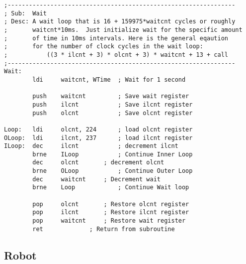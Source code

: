 \documentclass[12pt,letterpaper]{article}
\begin{document}
\begin{verbatim}
;----------------------------------------------------------------
; Sub:  Wait
; Desc: A wait loop that is 16 + 159975*waitcnt cycles or roughly 
;       waitcnt*10ms.  Just initialize wait for the specific amount 
;       of time in 10ms intervals. Here is the general eqaution
;       for the number of clock cycles in the wait loop:
;           ((3 * ilcnt + 3) * olcnt + 3) * waitcnt + 13 + call
;----------------------------------------------------------------
Wait:
        ldi     waitcnt, WTime  ; Wait for 1 second

        push    waitcnt         ; Save wait register
        push    ilcnt           ; Save ilcnt register
        push    olcnt           ; Save olcnt register

Loop:   ldi     olcnt, 224      ; load olcnt register
OLoop:  ldi     ilcnt, 237      ; load ilcnt register
ILoop:  dec     ilcnt           ; decrement ilcnt
        brne    ILoop           ; Continue Inner Loop
        dec     olcnt       ; decrement olcnt
        brne    OLoop           ; Continue Outer Loop
        dec     waitcnt     ; Decrement wait 
        brne    Loop            ; Continue Wait loop    

        pop     olcnt       ; Restore olcnt register
        pop     ilcnt       ; Restore ilcnt register
        pop     waitcnt     ; Restore wait register
        ret             ; Return from subroutine
\end{verbatim}

\subsection{Robot}
\end{document}
